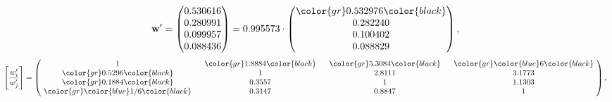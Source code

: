 \begin{example}
\begin{equation*}
\mathbf{w}^{\prime} =
\begin{pmatrix}
0.530616\\
0.280991\\
0.099957\\
0.088436
\end{pmatrix} =
0.995573\cdot
\begin{pmatrix}
\color{gr} 0.532976\color{black} \\
0.282240\\
0.100402\\
0.088829
\end{pmatrix},
\end{equation*}
\begin{equation*}
\left[ \frac{{w}^{\prime}_i}{{w}^{\prime}_j} \right] =
\begin{pmatrix}
$\,\,$ 1 $\,\,$ & $\,\,$\color{gr} 1.8884\color{black} $\,\,$ & $\,\,$\color{gr} 5.3084\color{black} $\,\,$ & $\,\,$\color{gr} \color{blue} 6\color{black} $\,\,$ \\
$\,\,$\color{gr} 0.5296\color{black} $\,\,$ & $\,\,$ 1 $\,\,$ & $\,\,$2.8111$\,\,$ & $\,\,$3.1773  $\,\,$ \\
$\,\,$\color{gr} 0.1884\color{black} $\,\,$ & $\,\,$0.3557$\,\,$ & $\,\,$ 1 $\,\,$ & $\,\,$1.1303 $\,\,$ \\
$\,\,$\color{gr} \color{blue}  1/6\color{black} $\,\,$ & $\,\,$0.3147$\,\,$ & $\,\,$0.8847$\,\,$ & $\,\,$ 1  $\,\,$ \\
\end{pmatrix},
\end{equation*}
\end{example}
\newpage

